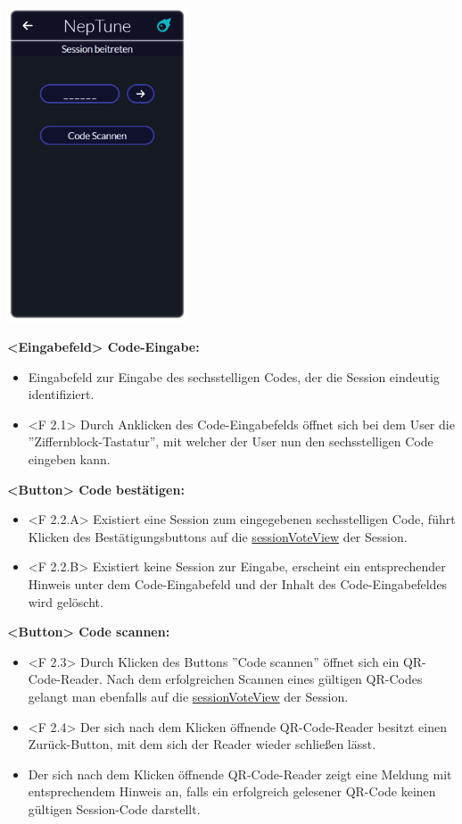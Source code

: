 \documentclass[oneside, ngerman]{sdqtechreport}
\begin{document}
\begin{center}
    \hypertarget{joinSessionView}{}
    \includegraphics[width=0.4\textwidth]{LATEX/Pflichtenheft/GraphicDesigns/userJoinGroupPage.png}
\end{center}

\textbf{<Eingabefeld> Code-Eingabe:}
\begin{itemize}
    \item Eingabefeld zur Eingabe des sechsstelligen Codes, der die Session eindeutig identifiziert.
    \hypertarget{<F 2.1> }{}
    \item <F 2.1> Durch Anklicken des Code-Eingabefelds öffnet sich bei dem User die ''Ziffernblock-Tastatur'', mit welcher der User nun den sechsstelligen Code eingeben kann.
\end{itemize}

\textbf{<Button> Code bestätigen:}
\begin{itemize}
    \hypertarget{<F 2.2.A>}{}
    \item <F 2.2.A> Existiert eine Session zum eingegebenen sechsstelligen Code, führt Klicken des Bestätigungsbuttons auf die \hyperlink{sessionVoteView}{sessionVoteView} der Session.
    \hypertarget{<F 2.2.B>}{}
    \item <F 2.2.B> Existiert keine Session zur Eingabe, erscheint ein entsprechender Hinweis unter dem Code-Eingabefeld und der Inhalt des Code-Eingabefeldes wird gelöscht.
\end{itemize}

\textbf{<Button> Code scannen:}
\begin{itemize}
    \hypertarget{<F 2.3>}{}
    \item <F 2.3> Durch Klicken des Buttons ''Code scannen'' öffnet sich ein QR-Code-Reader. Nach dem erfolgreichen Scannen eines gültigen QR-Codes gelangt man ebenfalls auf die \hyperlink{sessionVoteView}{sessionVoteView} der Session.
    \hypertarget{<F 2.4>}{}
    \item <F 2.4> Der sich nach dem Klicken öffnende QR-Code-Reader besitzt einen Zurück-Button, mit dem sich der Reader wieder schließen lässt.
    \item Der sich nach dem Klicken öffnende QR-Code-Reader zeigt eine Meldung mit entsprechendem Hinweis an, falls ein erfolgreich gelesener QR-Code keinen gültigen Session-Code darstellt.
\end{itemize}
\end{document}
